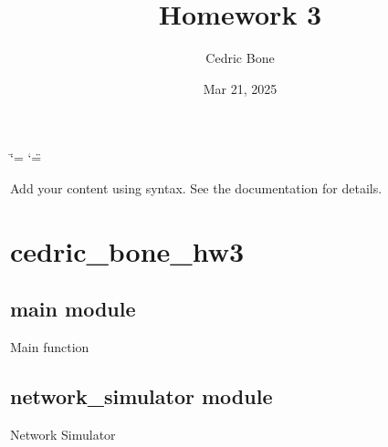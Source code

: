 \documentclass[letterpaper,10pt,english]{sphinxmanual}
\title{Homework 3}
\date{Mar 21, 2025}
\author{Cedric Bone}
\begin{document}
\ifdefined\shorthandoff
  \ifnum\catcode`\=\string=\active\shorthandoff{=}\fi
  \ifnum\catcode`\"=\active{}\fi
\fi

\pagestyle{empty}
\sphinxmaketitle
\pagestyle{plain}
\sphinxtableofcontents
\pagestyle{normal}
\label{\detokenize{index::doc}}


\sphinxAtStartPar
Add your content using  syntax. See the
documentation for details.

\sphinxstepscope


\chapter{cedric\_bone\_hw3}
\label{\detokenize{modules:cedric-bone-hw3}}\label{\detokenize{modules::doc}}
\sphinxstepscope


\section{main module}
\label{\detokenize{main:module-main}}\label{\detokenize{main:main-module}}\label{\detokenize{main::doc}}

\begin{fulllineitems}
\label{\detokenize{main:main.main}}
\pysigstartsignatures
\pysiglinewithargsret
{}
{}
{}
\pysigstopsignatures
\sphinxAtStartPar
Main function

\end{fulllineitems}


\sphinxstepscope


\section{network\_simulator module}
\label{\detokenize{network_simulator:module-network_simulator}}\label{\detokenize{network_simulator:network-simulator-module}}\label{\detokenize{network_simulator::doc}}
\sphinxAtStartPar
Network Simulator
\end{document}
